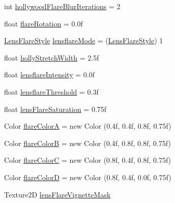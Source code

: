 \begin{DoxyCompactItemize}
\item 
int \mbox{\hyperlink{class_unity_standard_assets_1_1_image_effects_1_1_bloom_a2725829a73da81eac2e5b05b20275190}{hollywood\+Flare\+Blur\+Iterations}} = 2
\item 
float \mbox{\hyperlink{class_unity_standard_assets_1_1_image_effects_1_1_bloom_a8364a7008d547ddb4122931e37b1b2ab}{flare\+Rotation}} = 0.\+0f
\item 
\mbox{\hyperlink{class_unity_standard_assets_1_1_image_effects_1_1_bloom_aef3c132e0ec321165c67adf5364605dd}{Lens\+Flare\+Style}} \mbox{\hyperlink{class_unity_standard_assets_1_1_image_effects_1_1_bloom_a4cf3b33e298d53fd50e645625c5041d7}{lensflare\+Mode}} = (\mbox{\hyperlink{class_unity_standard_assets_1_1_image_effects_1_1_bloom_aef3c132e0ec321165c67adf5364605dd}{Lens\+Flare\+Style}}) 1
\item 
float \mbox{\hyperlink{class_unity_standard_assets_1_1_image_effects_1_1_bloom_a91ec5bdad719a72c259bb82eb6b01e30}{holly\+Stretch\+Width}} = 2.\+5f
\item 
float \mbox{\hyperlink{class_unity_standard_assets_1_1_image_effects_1_1_bloom_a3e253ef2524cedae9897c098e2d66a4f}{lensflare\+Intensity}} = 0.\+0f
\item 
float \mbox{\hyperlink{class_unity_standard_assets_1_1_image_effects_1_1_bloom_ab2bd52ff1c67ee08160907dddd1a16d1}{lensflare\+Threshold}} = 0.\+3f
\item 
float \mbox{\hyperlink{class_unity_standard_assets_1_1_image_effects_1_1_bloom_acb6efe3025fcd47b88f091e1e8f3264c}{lens\+Flare\+Saturation}} = 0.\+75f
\item 
Color \mbox{\hyperlink{class_unity_standard_assets_1_1_image_effects_1_1_bloom_a7fc2c75604f98886542c7800dd562bb0}{flare\+ColorA}} = new Color (0.\+4f, 0.\+4f, 0.\+8f, 0.\+75f)
\item 
Color \mbox{\hyperlink{class_unity_standard_assets_1_1_image_effects_1_1_bloom_a833bbcadda2293c152c16cffe951583e}{flare\+ColorB}} = new Color (0.\+4f, 0.\+8f, 0.\+8f, 0.\+75f)
\item 
Color \mbox{\hyperlink{class_unity_standard_assets_1_1_image_effects_1_1_bloom_af55ead429d32bfbf0f44bb05c623afb3}{flare\+ColorC}} = new Color (0.\+8f, 0.\+4f, 0.\+8f, 0.\+75f)
\item 
Color \mbox{\hyperlink{class_unity_standard_assets_1_1_image_effects_1_1_bloom_a1f77c697db2943130c91f35fc5bf55dc}{flare\+ColorD}} = new Color (0.\+8f, 0.\+4f, 0.\+0f, 0.\+75f)
\item 
Texture2D \mbox{\hyperlink{class_unity_standard_assets_1_1_image_effects_1_1_bloom_ab49b8eb3ce932d8e057dd612d86024d2}{lens\+Flare\+Vignette\+Mask}}

\end{DoxyCompactItemize}
